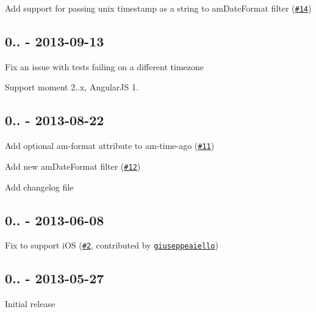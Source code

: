 \begin{DoxyItemize}
\item Add support for passing unix timestamp as a string to {\ttfamily am\+Date\+Format} filter (\href{https://github.com/urish/angular-moment/issues/14}{\tt \#14})
\end{DoxyItemize}

\subsection*{0.. -\/ 2013-\/09-\/13}


\begin{DoxyItemize}
\item Fix an issue with tests failing on a different timezone
\item Support moment 2..\+x, Angular\+JS 1.
\end{DoxyItemize}

\subsection*{0.. -\/ 2013-\/08-\/22}


\begin{DoxyItemize}
\item Add optional {\ttfamily am-\/format} attribute to {\ttfamily am-\/time-\/ago} (\href{https://github.com/urish/angular-moment/issues/11}{\tt \#11})
\item Add new {\ttfamily am\+Date\+Format} filter (\href{https://github.com/urish/angular-moment/issues/12}{\tt \#12})
\item Add changelog file
\end{DoxyItemize}

\subsection*{0.. -\/ 2013-\/06-\/08}


\begin{DoxyItemize}
\item Fix to support i\+OS (\href{https://github.com/urish/angular-moment/pull/2}{\tt \#2}, contributed by \href{https://github.com/giuseppeaiello}{\tt giuseppeaiello})
\end{DoxyItemize}

\subsection*{0.. -\/ 2013-\/05-\/27}


\begin{DoxyItemize}
\item Initial release 
\end{DoxyItemize}
